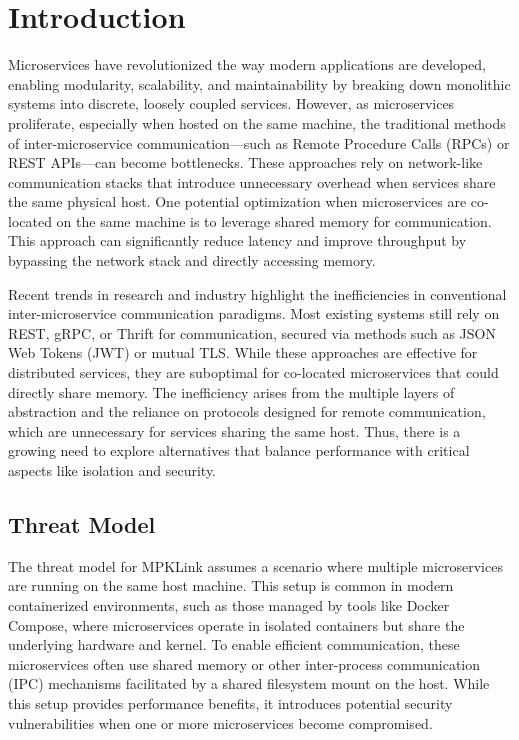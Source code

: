 \documentclass[letterpaper,twocolumn,10pt]{article}
\begin{document}
\section{Introduction}
Microservices have revolutionized the way modern applications are developed, enabling modularity, scalability, and maintainability by breaking down monolithic systems into discrete, loosely coupled services.
However, as microservices proliferate, especially when hosted on the same machine, the traditional methods of inter-microservice communication—such as Remote Procedure Calls (RPCs) or REST APIs—can become bottlenecks.
These approaches rely on network-like communication stacks that introduce unnecessary overhead when services share the same physical host.
One potential optimization when microservices are co-located on the same machine is to leverage shared memory for communication.
This approach can significantly reduce latency and improve throughput by bypassing the network stack and directly accessing memory.

Recent trends in research and industry highlight the inefficiencies in conventional inter-microservice communication paradigms.
Most existing systems still rely on REST, gRPC, or Thrift for communication, secured via methods such as JSON Web Tokens (JWT) or mutual TLS.
While these approaches are effective for distributed services, they are suboptimal for co-located microservices that could directly share memory.
The inefficiency arises from the multiple layers of abstraction and the reliance on protocols designed for remote communication, which are unnecessary for services sharing the same host.
Thus, there is a growing need to explore alternatives that balance performance with critical aspects like isolation and security.

\subsection{Threat Model}
The threat model for MPKLink assumes a scenario where multiple microservices are running on the same host machine.
This setup is common in modern containerized environments, such as those managed by tools like Docker Compose, where microservices operate in isolated containers but share the underlying hardware and kernel.
To enable efficient communication, these microservices often use shared memory or other inter-process communication (IPC) mechanisms facilitated by a shared filesystem mount on the host.
While this setup provides performance benefits, it introduces potential security vulnerabilities when one or more microservices become compromised.
\end{document}
